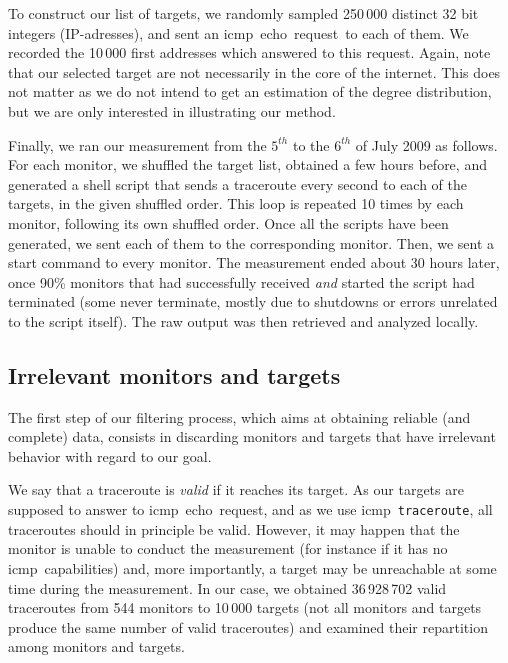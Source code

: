 \documentclass[conference]{IEEEtran}
\newcommand{\traceroute}{{\tt traceroute}}
\newcommand{\icmp}{{\sc icmp}}
\newcommand{\echo}{{\sc echo}}
\newcommand{\request}{{\sc request}}
\begin{document}
To construct our list of targets, we randomly sampled 250\,000 distinct 32 bit integers (IP-adresses), and sent an \icmp\ \echo\ \request\ to each of them. We recorded the 10\,000 first addresses which answered to this request. Again, note that our selected target are not necessarily in the core of the internet. This does not matter as we do not intend to get an estimation of the degree distribution, but we are only interested in illustrating our method.



Finally, we ran our measurement from the $5^{th}$ to the $6^{th}$ of July 2009 as follows. 
For each monitor, we shuffled the target list, obtained a few hours before, and generated a shell script
that sends a traceroute every second to each of the
targets, in the given shuffled order. This loop is repeated 10 times by each monitor, following its own shuffled order.
Once all the scripts have been generated, we sent each of them to the
corresponding monitor. Then, we sent a start command to every
monitor.
The measurement ended about 30 hours later, once 90\% monitors that had successfully received
\emph{and} started the script had terminated (some never terminate, mostly due to
shutdowns or errors unrelated to the script itself).
The raw output was then retrieved and analyzed locally.



\subsection{Irrelevant monitors and targets}\label{sec-monitors-targets}



The first step of our filtering process, which aims at obtaining reliable (and complete) data, consists in discarding monitors and targets that have irrelevant behavior with regard to our goal.



We say that a traceroute is {\em valid} if it reaches its target. As our targets are supposed to answer to \icmp\ \echo\ \request, and as we use \icmp\ \traceroute, all traceroutes should in principle be valid. However, it may happen that the monitor is unable to conduct the measurement (for instance if it has no \icmp\ capabilities) and, more importantly, a target may be unreachable at some time during the measurement.
In our case, we obtained 36\,928\,702 valid traceroutes from 544 monitors to 10\,000 targets (not all monitors and targets produce the same number of valid traceroutes) and examined their repartition among monitors and targets.
\end{document}
